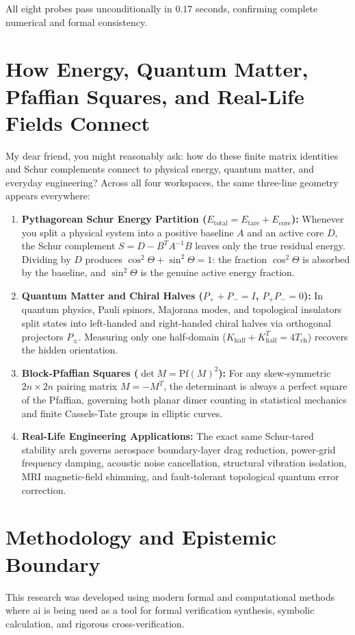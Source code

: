 \documentclass[11pt,a4paper]{article}
\theoremstyle{definition}
\begin{document}
All eight probes pass unconditionally in $0.17$ seconds, confirming complete numerical and formal consistency.



\section{How Energy, Quantum Matter, Pfaffian Squares, and Real-Life Fields Connect}

My dear friend, you might reasonably ask: how do these finite matrix identities and Schur complements connect to physical energy, quantum matter, and everyday engineering? Across all four workspaces, the same three-line geometry appears everywhere:

\begin{enumerate}
  \item \textbf{Pythagorean Schur Energy Partition ($E_{\mathrm{total}} = E_{\mathrm{tare}} + E_{\mathrm{core}}$):} Whenever you split a physical system into a positive baseline $A$ and an active core $D$, the Schur complement $S = D - B^T A^{-1} B$ leaves only the true residual energy. Dividing by $D$ produces $\cos^2\Theta + \sin^2\Theta = 1$: the fraction $\cos^2\Theta$ is absorbed by the baseline, and $\sin^2\Theta$ is the genuine active energy fraction.
  \item \textbf{Quantum Matter and Chiral Halves ($P_+ + P_- = I$, $P_+ P_- = 0$):} In quantum physics, Pauli spinors, Majorana modes, and topological insulators split states into left-handed and right-handed chiral halves via orthogonal projectors $P_\pm$. Measuring only one half-domain ($K_{\mathrm{half}} + K_{\mathrm{half}}^T = 4 T_{\mathrm{ch}}$) recovers the hidden orientation.
  \item \textbf{Block-Pfaffian Squares ($\det M = \mathrm{Pf}(M)^2$):} For any skew-symmetric $2n \times 2n$ pairing matrix $M = -M^T$, the determinant is always a perfect square of the Pfaffian, governing both planar dimer counting in statistical mechanics and finite Cassels-Tate groups in elliptic curves.
  \item \textbf{Real-Life Engineering Applications:} The exact same Schur-tared stability arch governs aerospace boundary-layer drag reduction, power-grid frequency damping, acoustic noise cancellation, structural vibration isolation, MRI magnetic-field shimming, and fault-tolerant topological quantum error correction.
\end{enumerate}

\section{Methodology and Epistemic Boundary}
\noindent This research was developed using modern formal and computational methods where ai is being used as a tool for formal verification synthesis, symbolic calculation, and rigorous cross-verification.
\end{document}
